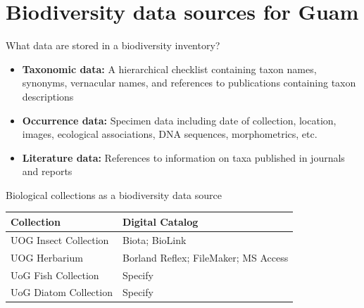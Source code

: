 \documentclass[]{beamer}
\begin{document}
\section{Biodiversity data sources for Guam}

\begin{frame}{What data are stored in a biodiversity inventory?}
\begin{itemize}
\item \textbf{Taxonomic data:} A hierarchical checklist containing taxon names, synonyms, vernacular names, and references to publications containing taxon descriptions
\item \textbf{Occurrence data:} Specimen data including date of collection, location, images, ecological associations, DNA sequences, morphometrics, etc.
\item \textbf{Literature data:} References to information on taxa published in journals and reports
\end{itemize}
\end{frame}

\begin{frame}{Biological collections as a biodiversity data source}

	\begin{figure}
		\begin{minipage}[t]{.48\textheight}
		\end{minipage}
		\begin{minipage}[t]{0.25\textheight}
		\end{minipage}
	\end{figure} 

\begin{table}[]
\centering
\label{my-label}
\begin{tabular}{@{}ll@{}}
\toprule
Collection            & Digital Catalog                      \\ \midrule
UOG Insect Collection & Biota; BioLink                       \\
UOG Herbarium         & Borland Reflex; FileMaker; MS Access \\
UoG Fish Collection   & Specify                              \\
UoG Diatom Collection & Specify                              \\ \bottomrule
\end{tabular}
\end{table}

\end{frame}
\end{document}
